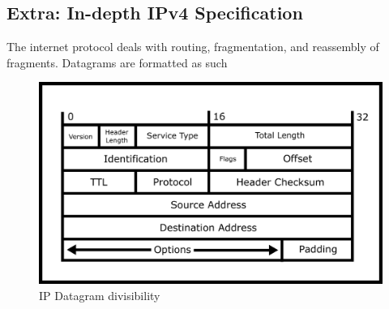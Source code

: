 \subsection{Extra: In-depth IPv4 Specification}

The internet protocol deals with routing, fragmentation, and reassembly of fragments.
Datagrams are formatted as such

\begin{figure}[H]
  \centering
\includegraphics[width=.8\textwidth]{networking/drawings/ip_datagram.png}
\caption{IP Datagram divisibility}
\end{figure}

